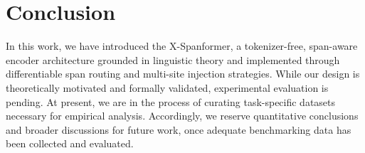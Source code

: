 \section{Conclusion}

In this work, we have introduced the X-Spanformer, a tokenizer-free, span-aware encoder architecture grounded in linguistic theory and implemented through differentiable span routing and multi-site injection strategies. While our design is theoretically motivated and formally validated, experimental evaluation is pending. At present, we are in the process of curating task-specific datasets necessary for empirical analysis. Accordingly, we reserve quantitative conclusions and broader discussions for future work, once adequate benchmarking data has been collected and evaluated.
